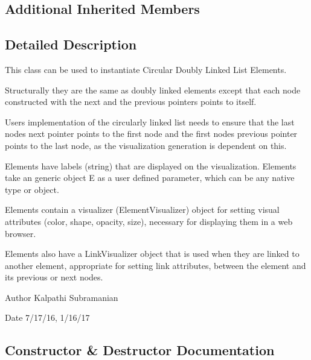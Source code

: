 \subsection*{Additional Inherited Members}


\subsection{Detailed Description}
This class can be used to instantiate Circular Doubly Linked List Elements. 

Structurally they are the same as doubly linked elements except that each node constructed with the next and the previous pointers points to itself.

User\textquotesingle{}s implementation of the circularly linked list needs to ensure that the last node\textquotesingle{}s next pointer points to the first node and the first node\textquotesingle{}s previous pointer points to the last node, as the visualization generation is dependent on this.

Elements have labels (string) that are displayed on the visualization. Elements take an generic object E as a user defined parameter, which can be any native type or object.

Elements contain a visualizer (Element\+Visualizer) object for setting visual attributes (color, shape, opacity, size), necessary for displaying them in a web browser.

Elements also have a Link\+Visualizer object that is used when they are linked to another element, appropriate for setting link attributes, between the element and its previous or next nodes.

\begin{DoxyAuthor}{Author}
Kalpathi Subramanian
\end{DoxyAuthor}
\begin{DoxyDate}{Date}
7/17/16, 1/16/17 
\end{DoxyDate}


\subsection{Constructor \& Destructor Documentation}
\hypertarget{classbridges_1_1circ__dl__element_1_1_circ_d_lelement_a58a07a5b75177d5f00fe5824f7f1413e}{}
